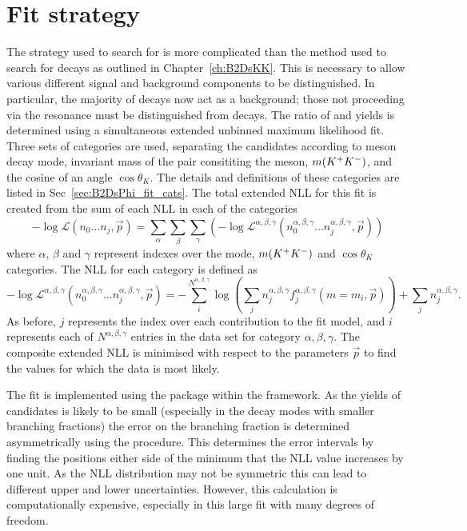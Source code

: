 \section{Fit strategy}
\label{sec:B2DsPhi_fitstrategy}
The strategy used to search for \decay{\Bp}{\Dsp\phiz} is more complicated than the method used to search for \decay{\Bp}{\Dsp\Kp\Km} decays as outlined in Chapter~\ref{ch:B2DsKK}. This is necessary to allow various different signal and background components to be distinguished. In particular, the majority of \decay{\Bp}{\Dsp\Kp\Km} decays now act as a background; those not proceeding via the \phiz resonance must be distinguished from \decay{\Bp}{\Dsp\phiz} decays. 
The ratio of \decay{\Bp}{\Dsp\phiz} and \decay{\Bp}{\Dsp\Dzb} yields is determined using a simultaneous extended unbinned maximum likelihood fit. Three sets of categories are used, separating the candidates according to \Dsp meson decay mode, invariant mass of the \Kp\Km pair consititing the \phiz meson, $m({{K}^+}{{K}^-})$, and the cosine of an angle $\cos\theta_{K}$. The details and definitions of these categories are listed in Sec~\ref{sec:B2DsPhi_fit_cats}. 
The total extended NLL for this fit is created from the sum of each NLL in each of the categories
\begin{equation}
-\log\mathcal{L}(n_{0}...n_{j},\vec{p}) = \sum_{\alpha} \sum_{\beta} \sum_{\gamma} \left(-\log\mathcal{L^{\alpha,\beta,\gamma}}(n_{0}^{\alpha,\beta,\gamma}...n_{j}^{\alpha,\beta,\gamma},\vec{p}) \right)
\end{equation} 
where $\alpha$, $\beta$ and $\gamma$ represent indexes over the \Dsp mode, $m({{K}^+}{{K}^-})$ and $\cos\theta_{K}$ categories.
The NLL for each category is defined as
\begin{equation}
-\log\mathcal{L^{\alpha,\beta,\gamma}}(n_{0}^{\alpha,\beta,\gamma}...n_{j}^{\alpha,\beta,\gamma},\vec{p}) = -\sum_{i}^{N^{\alpha,\beta,\gamma}} \log \left( \sum_{j} n_{j}^{\alpha,\beta,\gamma} f_{j}^{\alpha,\beta,\gamma}(m=m_{i},\vec{p}) \right) + \sum_{j}n_{j}^{\alpha,\beta,\gamma}.
\end{equation} 
As before, $j$ represents the index over each contribution to the fit model, and $i$ represents each of $N^{\alpha,\beta,\gamma}$ entries in the data set for category $\alpha,\beta,\gamma$. 
The composite extended NLL is minimised with respect to the parameters $\vec{p}$ to find the values for which the data is most likely.

The fit is implemented using the \roofit package within the \root framework. 
As the yields of candidates is likely to be small (especially in the \Dsp decay modes with smaller branching fractions) the error on the branching fraction is determined asymmetrically using the \minos procedure. This determines the error intervals by finding the positions either side of the minimum that the NLL value increases by one unit. As the NLL distribution may not be symmetric this can lead to different upper and lower uncertainties. However, this calculation is computationally expensive, especially in this large fit with many degrees of freedom.  


